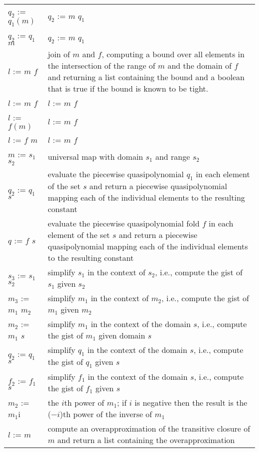 \begin{supertabular}{p{0.35\textwidth}p{0.6\textwidth}}
\\
$q_2$ := $q_1(m)$ & $q_2$ := $m$  $q_1$
\\
$q_2$ := $q_1$  $m$ & $q_2$ := $m$  $q_1$
\\
$l$ := $m$  $f$ & join of $m$ and $f$, computing a bound
over all elements in the intersection of the range of $m$ and the domain
of $f$ and returning a list containing the bound
and a boolean that is true if the bound is known to be tight.
\\
$l$ := $m$  $f$ & $l$ := $m$  $f$
\\
$l$ := $f(m)$ & $l$ := $m$  $f$
\\
$l$ := $f$  $m$ & $l$ := $m$  $f$
\\
$m$ := $s_1$ \ai[\tt]{->} $s_2$ & universal map with domain $s_1$
and range $s_2$
\\
$q_2$ := $q_1$  $s$ &
evaluate the piecewise quasipolynomial $q_1$ in each element
of the set $s$ and return a piecewise quasipolynomial
mapping each of the individual elements to the resulting
constant
\\
$q$ := $f$  $s$ &
evaluate the piecewise quasipolynomial fold $f$ in each element
of the set $s$ and return a piecewise quasipolynomial
mapping each of the individual elements to the resulting
constant
\\
$s_3$ := $s_1$ \ai[\tt]{\%} $s_2$ &
simplify $s_1$ in the context of $s_2$, i.e., compute
the gist of $s_1$ given $s_2$
\\
$m_3$ := $m_1$ \ai[\tt]{\%} $m_2$ &
simplify $m_1$ in the context of $m_2$, i.e., compute
the gist of $m_1$ given $m_2$
\\
$m_2$ := $m_1$ \ai[\tt]{\%} $s$ &
simplify $m_1$ in the context of the domain $s$, i.e., compute
the gist of $m_1$ given domain $s$
\\
$q_2$ := $q_1$ \ai[\tt]{\%} $s$ &
simplify $q_1$ in the context of the domain $s$, i.e., compute
the gist of $q_1$ given $s$
\\
$f_2$ := $f_1$ \ai[\tt]{\%} $s$ &
simplify $f_1$ in the context of the domain $s$, i.e., compute
the gist of $f_1$ given $s$
\\
$m_2$ := $m_1$\ai[\tt]{\^{}}i & the $i$th power of $m_1$;
if $i$ is negative then the result is the ($-i$)th power of the inverse
of $m_1$
\\
$l$ := $m$\ai[\tt]{\^{}+} &
compute an overapproximation of the transitive closure
of $m$ and return a list containing the overapproximation

\end{supertabular}
